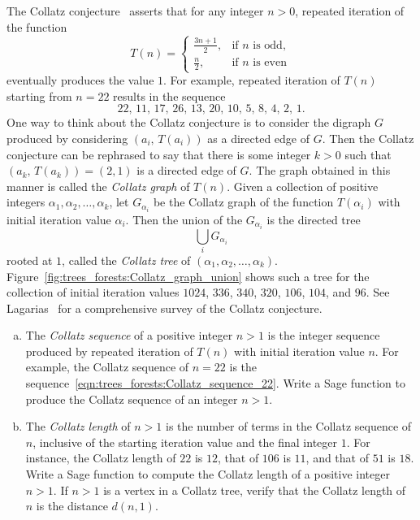 \begin{problem}
\item The Collatz conjecture~\cite{Lagarias1985} asserts that for any
  integer $n > 0$, repeated iteration of the function
  \[
  T(n)
  =
  \begin{cases}
  \frac{3n + 1}{2}, & \text{if $n$ is odd}, \\
  \frac{n}{2}, & \text{if $n$ is even}
  \end{cases}
  \]
  eventually produces the value $1$. For example, repeated iteration
  of $T(n)$ starting from $n = 22$ results in the sequence
  \begin{equation}
  \label{eqn:trees_forests:Collatz_sequence_22}
  22,\, 11,\, 17,\, 26,\, 13,\, 20,\, 10,\, 5,\, 8,\, 4,\, 2,\, 1.
  \end{equation}
  One way to think about the Collatz conjecture is to consider the
  digraph $G$ produced by considering $(a_i,\, T(a_i))$ as a directed
  edge of $G$. Then the Collatz conjecture can be rephrased to say
  that there is some integer $k > 0$ such that
  $(a_k,\, T(a_k)) = (2, 1)$ is a directed edge of $G$. The graph
  obtained in this manner is called the \emph{Collatz graph} of
  $T(n)$. Given a collection of positive integers
  $\alpha_1, \alpha_2, \dots, \alpha_k$, let $G_{\alpha_i}$ be the
  Collatz graph of the function $T(\alpha_i)$ with initial iteration
  value $\alpha_i$. Then the union of the $G_{\alpha_i}$ is the
  directed tree
  \[
  \bigcup_i G_{\alpha_i}
  \]
  rooted at $1$, called the \emph{Collatz tree} of
  $(\alpha_1, \alpha_2, \dots, \alpha_k)$.
  Figure~\ref{fig:trees_forests:Collatz_graph_union} shows such a tree
  for the collection of initial iteration values $1024$, $336$, $340$,
  $320$, $106$, $104$, and $96$. See
  Lagarias~\cite{Lagarias2009a,Lagarias2009b} for a comprehensive
  survey of the Collatz conjecture.
  \begin{enumerate}[(a)]
  \item The \emph{Collatz sequence} of a positive integer $n > 1$ is
    the integer sequence produced by repeated iteration of $T(n)$ with
    initial iteration value $n$. For example, the Collatz sequence
    of $n = 22$ is the
    sequence~\eqref{eqn:trees_forests:Collatz_sequence_22}. Write a
    Sage function to produce the Collatz sequence of an integer $n > 1$.

  \item The \emph{Collatz length} of $n > 1$ is the number of terms in
    the Collatz sequence of $n$, inclusive of the starting iteration
    value and the final integer $1$. For instance, the Collatz length
    of $22$ is $12$, that of $106$ is $11$, and that of $51$ is
    $18$. Write a Sage function to compute the Collatz length of a
    positive integer $n > 1$. If $n > 1$ is a vertex in a Collatz
    tree, verify that the Collatz length of $n$ is the distance
    $d(n,1)$.


\end{enumerate}
\end{problem}

